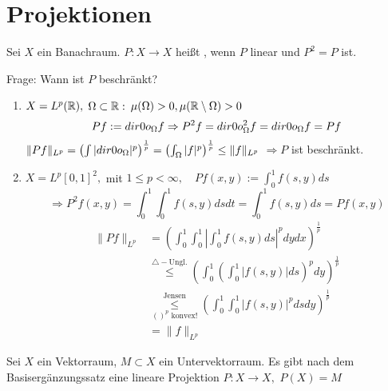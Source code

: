 
\section{Projektionen}



\begin{definition} \label{def:11.1-Projektion}
	Sei $X$ ein Banachraum. $P: X \rightarrow X$ hei{\ss}t , wenn $P$ linear und $P^{2} = P$ ist.
\end{definition}

Frage: Wann ist $P$ beschränkt?


\begin{beispiel}
	\begin{enumerate}[label=\alph*\upshape)]
		\item $X = L^{p}(\mathbb{R}), $ $\Omega \subset \mathbb{R}: $ $\mu(\Omega) > 0, \mu(\mathbb{R} \setminus \Omega) > 0$
			\[ P f := \1_{\Omega} f \Rightarrow P^{2} f = \1_{\Omega}^{2} f = \1_{\Omega} f = P f \]
			$\| P f \|_{L^{p}} = \left( \int | \1_{\Omega} |^{p} \right)^{\frac{1}{p}} = \left( \int_{\Omega} | f |^{p} \right)^{\frac{1}{p}} \leq \| f \|_{L^{p}}$ $\Rightarrow P$ ist beschränkt.
		\item $X = L^{p}[0, 1]^{2},$ mit $1 \leq p < \infty, \quad P f(x, y) := \int_{0}^{1} f(s, y) ds$
			\[ \Rightarrow P^{2} f (x, y) = \int_{0}^{1} \int_{0}^{1} f(s, y) ds dt = \int_{0}^{1} f(s, y) ds = P f(x, y) \]
			\begin{align*}
				\| P f \|_{L^{p}} & = \left( \int_{0}^{1} \int_{0}^{1} \left| \int_{0}^{1} f(s, y) ds \right|^{p} dy dx \right)^{\frac{1}{p}} \\
				& \overset{\triangle-\text{Ungl.}}{\leq} \left( \int_{0}^{1} \left( \int_{0}^{1} |f(s, y)| ds \right)^{p} dy \right)^{\frac{1}{p}} \\
				& \underset{()^{p} \text{ konvex!}}{\overset{\text{Jensen}}{\leq}}\left( \int_{0}^{1} \int_{0}^{1} |f(s, y)|^{p} ds dy \right)^{\frac{1}{p}} \\
				& = \| f \|_{L^{p}}
			\end{align*}
	\end{enumerate}
\end{beispiel}


\begin{bemerkung}
	Sei $X$ ein Vektorraum, $M \subset X$ ein Untervektorraum. Es gibt nach dem Basisergänzungssatz eine lineare Projektion $P: X \rightarrow X,$ $P(X) = M$	
\end{bemerkung}

